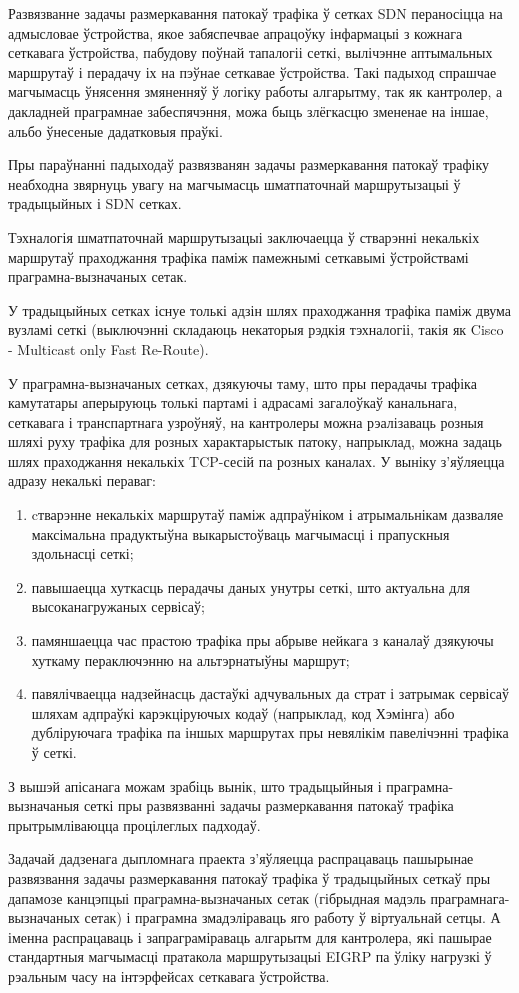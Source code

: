 Развязванне задачы размеркавання патокаў трафіка ў сетках SDN пераносіцца на адмысловае ўстройства,
якое забяспечвае апрацоўку інфармацыі з кожнага сеткавага ўстройства, пабудову поўнай тапалогіі сеткі, вылічэнне аптымальных маршрутаў і перадачу іх на пэўнае сеткавае ўстройства.
Такі падыход спрашчае магчымасць ўнясення змяненняў ў логіку работы алгарытму, так як кантролер,
а дакладней праграмнае забеспячэння, можа быць злёгкасцю змененае на іншае, альбо ўнесеные дадатковыя праўкі.

Пры параўнанні падыходаў развязванян задачы размеркавання патокаў трафіку неабходна звярнуць увагу на магчымасць шматпаточнай маршрутызацыі ў
традыцыйных і SDN сетках.

Тэхналогія шматпаточнай маршрутызацыі заключаецца ў стварэнні некалькіх
маршрутаў праходжання трафіка паміж памежнымі сеткавымі ўстройствамі
праграмна-вызначаных сетак.

У традыцыйных сетках існуе толькі адзін шлях праходжання трафіка паміж
двума вузламі сеткі (выключэнні складаюць некаторыя рэдкія тэхналогіі, такія як Cisco - Multicast only Fast Re-Route).

У праграмна-вызначаных сетках, дзякуючы таму, што пры перадачы трафіка
камутатары аперыруюць толькі партамі і адрасамі загалоўкаў канальнага, сеткавага і транспартнага узроўняў, на кантролеры можна рэалізаваць розныя шляхі руху трафіка для розных характарыстык патоку, напрыклад, можна задаць шлях праходжання некалькіх TCP-сесій па розных каналах. У выніку з'яўляецца адразу некалькі пераваг:
\begin{enumerate}
    \item cтварэнне некалькіх маршрутаў паміж адпраўніком і атрымальнікам дазваляе максімальна прадуктыўна выкарыстоўваць магчымасці і прапускныя здольнасці сеткі;
    \item павышаецца хуткасць перадачы даных унутры сеткі, што актуальна для высоканагружаных сервісаў;
    \item памяншаецца час прастою трафіка пры абрыве нейкага з каналаў дзякуючы хуткаму пераключэнню на альтэрнатыўны маршрут;
    \item павялічваецца надзейнасць дастаўкі адчувальных да страт і затрымак сервісаў шляхам адпраўкі карэкціруючых кодаў (напрыклад, код Хэмінга) або дубліруючага трафіка па іншых маршрутах пры невялікім павелічэнні трафіка ў сеткі.
\end{enumerate}

З вышэй апісанага можам зрабіць вынік, што традыцыйныя і праграмна-вызначаныя сеткі
пры развязванні задачы размеркавання патокаў трафіка прытрымліваюцца процілеглых
падходаў.

Задачай дадзенага дыпломнага праекта з'яўляецца распрацаваць пашырынае развязвання задачы
размеркавання патокаў трафіка ў традыцыйных сеткаў пры дапамозе канцэпцыі праграмна-вызначаных сетак (гібрыдная мадэль праграмнага-вызначаных сетак) і праграмна
змадэліраваць яго работу ў віртуальнай сетцы.
А іменна распрацаваць і запраграміраваць алгарытм для кантролера, які пашырае стандартныя магчымасці пратакола маршрутызацыі EIGRP па ўліку нагрузкі ў рэальным часу на інтэрфейсах сеткавага ўстройства.
